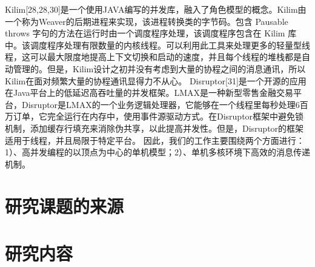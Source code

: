 Kilim[28,28,30]是一个使用JAVA编写的并发库，融入了角色模型的概念。Kilim由一个称为Weaver的后期进程来实现，该进程转换类的字节码。包含 Pausable throws 字句的方法在运行时由一个调度程序处理，该调度程序包含在 Kilim 库中。该调度程序处理有限数量的内核线程。可以利用此工具来处理更多的轻量型线程，这可以最大限度地提高上下文切换和启动的速度，并且每个线程的堆栈都是自动管理的。但是，Kilim设计之初并没有考虑到大量的协程之间的消息通讯，所以Kilim在面对频繁大量的协程通讯显得力不从心。
Disruptor[31]是一个开源的应用在Java平台上的低延迟高吞吐量的并发框架。LMAX是一种新型零售金融交易平台，Disruptor是LMAX的一个业务逻辑处理器，它能够在一个线程里每秒处理6百万订单，它完全运行在内存中，使用事件源驱动方式。在Disruptor框架中避免锁机制，添加缓存行填充来消除伪共享，以此提高并发性。但是，Disruptor的框架适用于线程，并且局限于特定平台。
因此，我们的工作主要围绕两个方面进行：1）、高并发编程的以顶点为中心的单机模型；2）、单机多核环境下高效的消息传递机制。

\section{研究课题的来源}

\section{研究内容}


